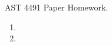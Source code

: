 \documentclass[12pt,preprint]{aastex}  %
\begin{document}
AST 4491 Paper Homework.

\begin{enumerate}
    \item 
\item 
\end{enumerate}
\end{document}
